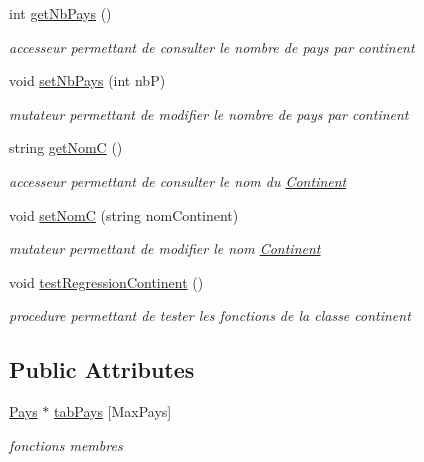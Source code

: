 \begin{DoxyCompactItemize}
int \mbox{\hyperlink{classContinent_a6d99d10cf3d36c4b59b691f4ea46a07f}{get\+Nb\+Pays}} ()
\begin{DoxyCompactList}\small\item\em accesseur permettant de consulter le nombre de pays par continent \end{DoxyCompactList}\item 
void \mbox{\hyperlink{classContinent_a888a4cf1b87c2a1343b0b22889e07ca9}{set\+Nb\+Pays}} (int nbP)
\begin{DoxyCompactList}\small\item\em mutateur permettant de modifier le nombre de pays par continent \end{DoxyCompactList}\item 
string \mbox{\hyperlink{classContinent_adf0ef7f12c574679b260163e96cdd410}{get\+NomC}} ()
\begin{DoxyCompactList}\small\item\em accesseur permettant de consulter le nom du \mbox{\hyperlink{classContinent}{Continent}} \end{DoxyCompactList}\item 
void \mbox{\hyperlink{classContinent_ae38f8aa88d22d30d2ee471b8fc2231f6}{set\+NomC}} (string nom\+Continent)
\begin{DoxyCompactList}\small\item\em mutateur permettant de modifier le nom \mbox{\hyperlink{classContinent}{Continent}} \end{DoxyCompactList}\item 
void \mbox{\hyperlink{classContinent_acdfb73de042fa4ad3dae23452839e6ae}{test\+Regression\+Continent}} ()
\begin{DoxyCompactList}\small\item\em procedure permettant de tester les fonctions de la classe continent \end{DoxyCompactList}\end{DoxyCompactItemize}
\subsection*{Public Attributes}
\begin{DoxyCompactItemize}
\item 
\mbox{\label{classContinent_a7d5821e39c3187a74dd6a977471a39a9}} 
\mbox{\hyperlink{classPays}{Pays}} $\ast$ \mbox{\hyperlink{classContinent_a7d5821e39c3187a74dd6a977471a39a9}{tab\+Pays}} \mbox{[}Max\+Pays\mbox{]}
\begin{DoxyCompactList}\small\item\em fonctions membres \end{DoxyCompactList}\end{DoxyCompactItemize}


